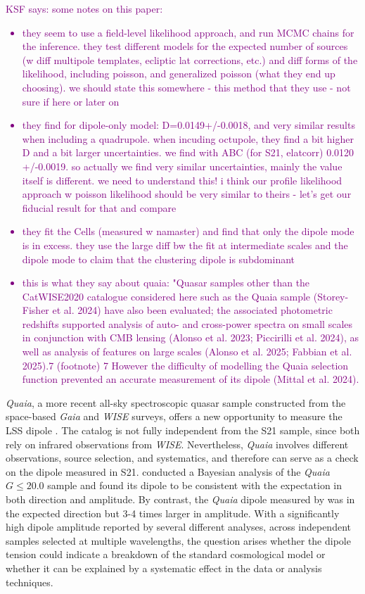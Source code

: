 \documentclass[modern]{aastex631}
\newcommand{\ksf}[1]{\textcolor{purple}{KSF says: #1}}
\newcommand{\quaia}{\textsl{Quaia}\xspace}
\newcommand{\gaia}{\textsl{Gaia}\xspace}
\newcommand{\wise}{\textsl{WISE}\xspace}
\begin{document}
\ksf{some notes on this paper:
\begin{itemize}
    \item they seem to use a field-level likelihood approach, and run MCMC chains for the inference. they test different models for the expected number of sources (w diff multipole templates, ecliptic lat corrections, etc.) and diff forms of the likelihood, including poisson, and generalized poisson (what they end up choosing). we should state this somewhere - this method that they use - not sure if here or later on
    \item they find for dipole-only model: D=0.0149+/-0.0018, and very similar results when including a quadrupole. when incuding octupole, they find a bit higher D and a bit larger uncertainties. we find with ABC (for S21, elatcorr) 0.0120 +/-0.0019. so actually we find very similar uncertainties, mainly the value itself is different. we need to understand this! i think our profile likelihood approach w poisson likelihood should be very similar to theirs - let's get our fiducial result for that and compare
    \item they fit the Cells (measured w namaster) and find that only the dipole mode is in excess. they use the large diff bw the fit at intermediate scales and the dipole mode to claim that the clustering dipole is subdominant
    \item this is what they say about quaia: "Quasar samples other than the CatWISE2020 catalogue considered here such as the Quaia sample (Storey-Fisher et al. 2024) have also been evaluated; the associated photometric redshifts supported analysis of auto- and cross-power spectra on small scales in conjunction with CMB lensing (Alonso et al. 2023; Piccirilli et al. 2024), as well as analysis of features on large scales (Alonso et al. 2025; Fabbian et al. 2025).7 (footnote) 7 However the difficulty of modelling the Quaia selection function prevented an accurate measurement of its dipole (Mittal et al. 2024).
\end{itemize}
}

\quaia, a more recent all-sky spectroscopic quasar sample constructed from the space-based \gaia and \wise surveys, offers a new opportunity to measure the LSS dipole \citep{storey-fisher_quaia_2024}.
The catalog is not fully independent from the S21 sample, since both rely on infrared observations from \textit{WISE}.
Nevertheless, \quaia involves different observations, source selection, and systematics, and therefore can serve as a check on the dipole measured in S21.
\citet{mittal_cosmic_2023} conducted a Bayesian analysis of the \quaia $G\le20.0$ sample and found its dipole to be consistent with the expectation in both direction and amplitude.
By contrast, the \quaia dipole measured by \citet{singal_cosmic_2024} was in the expected direction but 3-4 times larger in amplitude.
With a significantly high dipole amplitude reported by several different analyses, across independent samples selected at multiple wavelengths, the question arises whether the dipole tension could indicate a breakdown of the standard cosmological model or whether it can be explained by a systematic effect in the data or analysis techniques.
\end{document}
